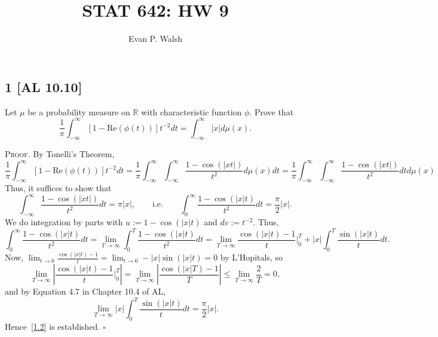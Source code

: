 \documentclass[12pt]{article}
\title{STAT 642: HW 9}
\author{Evan P. Walsh}
\newcounter{ProofCounter}
\newenvironment{Proof}{\stepcounter{ProofCounter}\textsc{Proof.}}{\hfill$\square$}
\begin{document}
\maketitle


\subsection*{1 [AL 10.10]}
\begin{tcolorbox}
  Let $\mu$ be a probability measure on $\mathbb{R}$ with characteristic function $\phi$. Prove that
  \[ \frac{1}{\pi} \int_{-\infty}^{\infty}[1 - \text{Re}(\phi(t))]t^{-2}dt = \int_{-\infty}^{\infty}|x|d\mu(x). \]
\end{tcolorbox}
\begin{Proof}
  By Tonelli's Theorem,
  \[
    \frac{1}{\pi}\int_{-\infty}^{\infty}[1 - \text{Re}(\phi(t))]t^{-2}dt = \frac{1}{\pi}\int_{-\infty}^{\infty}\int_{-\infty}^{\infty}\frac{1 -
    \cos(|xt|)}{t^{2}}d\mu(x) dt = \frac{1}{\pi}\int_{-\infty}^{\infty}\int_{-\infty}^{\infty}\frac{1 - \cos(|xt|)}{t^{2}}dt d\mu(x)
  \]
  Thus, it suffices to show that
  \begin{equation}
    \int_{-\infty}^{\infty}\frac{1 - \cos(|xt|)}{t^{2}}dt = \pi|x|, \qquad \text{i.e.} \qquad \int_{0}^{\infty}\frac{1 - \cos(|x|t)}{t^{2}}dt =
    \frac{\pi}{2}|x|.
    \label{1.2}
  \end{equation}
  We do integration by parts with $u := 1 - \cos(|x|t)$ and $dv := t^{-2}$. Thus,
  \[ \int_{0}^{\infty}\frac{1 - \cos(|x|t)}{t^{2}}dt = \lim_{T\rightarrow\infty}\int_{0}^{T}\frac{1 - \cos(|x|t)}{t^{2}}dt =
  \lim_{T\rightarrow\infty}\frac{\cos(|x|t) - 1}{t}\bigg|_{0}^{T} + |x|\int_{0}^{T}\frac{\sin(|x|t)}{t}dt. \]
  Now, $\lim_{t \rightarrow 0}\frac{\cos(|x|t) - 1}{t} = \lim_{t\rightarrow 0}-|x|\sin(|x|t) = 0$ by L'Hopitals, so
  \[
    \lim_{T\rightarrow\infty}\left|\frac{\cos(|x|t) - 1}{t}\bigg|_{0}^{T}\right| = \lim_{T\rightarrow\infty}\left|\frac{\cos(|x|T) - 1}{T}\right| 
    \leq \lim_{T\rightarrow\infty}\frac{2}{T} = 0,
  \]
  and by Equation 4.7 in Chapter 10.4 of AL,
  \[ \lim_{T\rightarrow\infty}|x|\int_{0}^{T}\frac{\sin(|x|t)}{t}dt = \frac{\pi}{2}|x|. \]
  Hence~\eqref{1.2} is established.
\end{Proof}


\newpage
\end{document}
